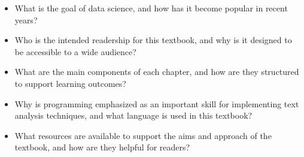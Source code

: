 \documentclass[
  letterpaper,
]{latex/krantz}
\providecommand{\tightlist}{%
  \setlength{\itemsep}{0pt}\setlength{\parskip}{0pt}}\usepackage{longtable,booktabs,array}
\begin{document}
\begin{tcolorbox}[enhanced jigsaw, left=2mm, arc=.35mm, colback=white, rightrule=.15mm, toprule=.15mm, breakable, leftrule=.75mm, opacityback=0, bottomrule=.15mm]
\begin{itemize}
\tightlist
\item
  What is the goal of data science, and how has it become popular in
  recent years?
\item
  Who is the intended readership for this textbook, and why is it
  designed to be accessible to a wide audience?
\item
  What are the main components of each chapter, and how are they
  structured to support learning outcomes?
\item
  Why is programming emphasized as an important skill for implementing
  text analysis techniques, and what language is used in this textbook?
\item
  What resources are available to support the aims and approach of the
  textbook, and how are they helpful for readers?
\end{itemize}

\end{tcolorbox}
\end{document}
